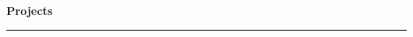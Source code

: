\documentclass{article}
\newenvironment{compactItemize}{
  \begin{itemize}[itemsep=0ex, parsep=0ex, partopsep=0ex, topsep= -7pt]
}{
  \end{itemize}
}
\newcommand{\jobInfo}[4]{
  \begingroup
  \setlength{\tabcolsep}{0ex}
  \begin{tabularx}{\linewidth}{X r}
    #1 & %
    #2\\ %
    #3 & %
    #4   %
  \end{tabularx}%
  \endgroup%
}
\begin{document}
\begin{comment}
\jobInfo{Applied Math TA}{Provo, UT}{BYU Math Department}{Winter 2019}
\begin{compactItemize}
  \item 3 times a week I held office hours to help ACME juniors with their Optimization and Mathematical Analysis homework.
  \item Usually helped between 5 and 10 students.
\end{compactItemize}
\medskip

\jobInfo{Lube Technician}{Provo, UT}{Jiffy Lube}{Summers 2015 and 2016}
\begin{compactItemize}
  \item Serviced up to 50 cars each day.
  \item Changed oil, rotated tires, replaced brake pads, checked and filled under-hood fluids.
  \item Performed basic inspections for wear and tear.
  \item Repaired windshield rock chips.
\end{compactItemize}
\medskip

\jobInfo{Private Tutor}{Hemet, CA}{Self Employed}{September 2012 -- April 2014}
\begin{compactItemize}
  \item Tutored 6 different students individually.  The students were in middle school and high school. 
\end{compactItemize}
\medskip

\jobInfo{Gas Station Clerk}{Idyllwild, CA}{Idyllwild Garage}{Summer 2011 and May 2012 -- January 2013}
\begin{compactItemize}
  \item Depending on the shift, would open or close the store.
  \item Stocked shelves and updated inventory.
  \item Dispensed propane for customers with tanks.
  \item Serviced customers and kept the store clean.
\end{compactItemize}
\medskip

\jobInfo{Landscape Maintenance Crewmember}{K\&M Strategic Management}{Hemet, CA}{Summer 2011 and May 2012 -- January 2013}
\begin{compactItemize}
  \item Leaf-blew the parking lots and picked up trash at managed medical properties every morning.
  \item Weeded, raked, and maintained the landscape at properties.
  \item Cleaned out an empty strip mall in preparation for sale.
  \item Repainted fences, parking lines, and breakrooms.
\end{compactItemize}
\medskip
\end{comment}
\textbf{Projects %
}
\smallskip
\hrule
\end{document}
